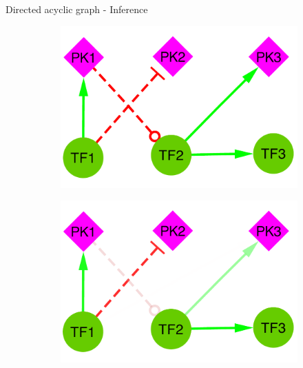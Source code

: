 \begin{frame}{Directed acyclic graph - Inference}



\begin{figure}[ht]
\centering
\begin{subfigure}[b]{0.23\textwidth}\centering\caption{}
\includegraphics[width=\textwidth]{analysis/fig/weight.pdf}\label{fig:dag_infer.a}
\end{subfigure}
\hfill
\begin{subfigure}[b]{0.23\textwidth}\centering\caption{}
\includegraphics[width=\textwidth]{analysis/fig/gnwweight.pdf}

\end{subfigure}
\end{figure}
\end{frame}
